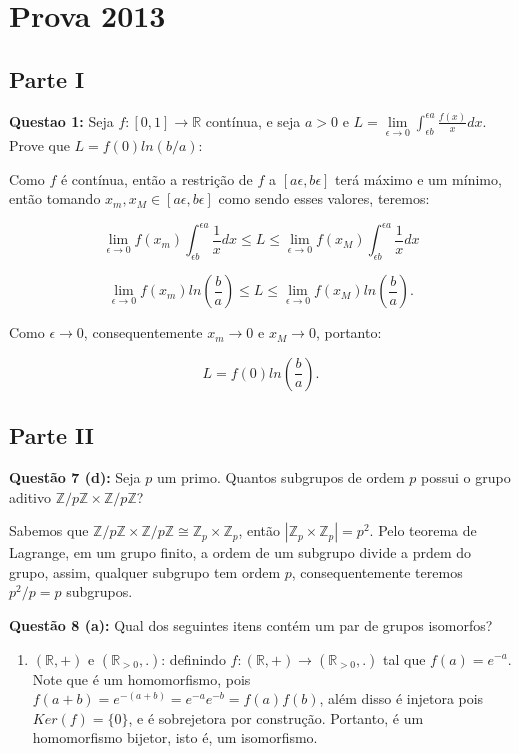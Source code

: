 \documentclass{article}
\begin{document}
\section{Prova 2013}
\subsection{Parte I}
\textbf{Questao 1:} Seja $f: [0,1] \to \mathbb R$ contínua, e seja $a>0$ e
$L = \lim \limits_{\epsilon \to 0} \int_{\epsilon b}^{\epsilon a} \frac{f(x)}{x}
dx$. Prove que $L = f(0)ln(b/a)$:

Como $f$ é contínua, então a restrição de $f$ a $[a\epsilon, b\epsilon]$ terá
máximo e um mínimo, então tomando $x_m, x_M \in [a\epsilon,
b\epsilon]$ como sendo esses valores, teremos:

$$\lim \limits_{\epsilon
\to 0} f(x_m) \int_{\epsilon b}^{\epsilon a} \frac{1}{x} dx \leq L \leq \lim
\limits_{\epsilon \to 0} f(x_M) \int_{\epsilon b}^{\epsilon a} \frac{1}{x} dx$$ 


$$\lim \limits_{\epsilon
\to 0} f(x_m) ln(\frac{b}{a}) \leq L \leq \lim \limits_{\epsilon \to 0} f(x_M)
ln(\frac{b}{a}).$$

Como $\epsilon \to 0$, consequentemente $x_m \to 0$ e $x_M \to 0$, portanto:

$$L =  f(0) ln(\frac{b}{a}).$$

\subsection{Parte II}
\textbf{Questão 7 (d):} Seja $p$ um primo. Quantos subgrupos de ordem $p$ possui o grupo aditivo $\mathbb{Z}/p\mathbb{Z} \times \mathbb{Z}/p\mathbb{Z}$?

Sabemos que $\mathbb{Z}/p\mathbb{Z} \times \mathbb{Z}/p\mathbb{Z} \cong \mathbb{Z}_{p} \times \mathbb{Z}_{p}$,
então $|\mathbb{Z}_{p} \times \mathbb{Z}_{p}| = p^2$. Pelo teorema de Lagrange, em um grupo finito, a ordem de um subgrupo divide a prdem do grupo, assim, qualquer subgrupo tem ordem $p$, consequentemente teremos $p^2 / p = p$ subgrupos.

\textbf{Questão 8 (a):} Qual dos seguintes itens contém um par de grupos isomorfos?

\begin{enumerate}[label=(\alph*)]
	\item $(\mathbb{R}, +)$ e $(\mathbb{R}_{>0}, .)$: definindo $ f: (\mathbb{R}, +) \to (\mathbb{R}_{>0}, .)$ tal que $f(a) = e^{-a}$. Note que é um homomorfismo, pois $f(a+b) = e^{-(a+b)} = e^{-a}e^{-b} = f(a)f(b)$, além disso é injetora pois $Ker(f)=\{0\}$, e é sobrejetora por construção. Portanto, é um homomorfismo bijetor, isto é, um isomorfismo.
\end{enumerate}
\end{document}
